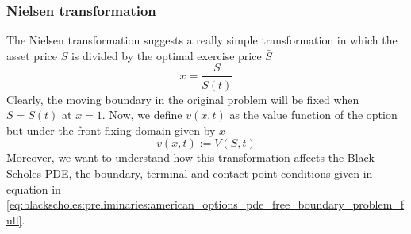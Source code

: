 \subsubsection{Nielsen transformation} \label{sec:blackscholes:frontfixingmethod:inversetransform}
The Nielsen transformation suggests a really simple transformation in which
the asset price $S$ is divided by the optimal exercise price $\bar{S}$
\begin{equation}
  x = \dfrac{S}{\bar{S}(t)}
  \label{eq:blackscholes:frontfixingmethod:inversetransform}
\end{equation}
Clearly, the moving boundary in the original problem will be fixed when $S=\bar{S}(t)$ at $x=1$. Now, we define $v(x,t)$ as the value function of the option but under the front fixing domain given by $x$
\begin{equation}
  v(x, t) := V(S, t)
  \label{eq:blackscholes:frontfixingmethod:inversetransform:value_function}
\end{equation}
Moreover, we want to understand how this transformation affects the Black-Scholes PDE, the boundary, terminal and contact point conditions given in equation in \eqref{eq:blackscholes:preliminaries:american_options_pde_free_boundary_problem_full}.

